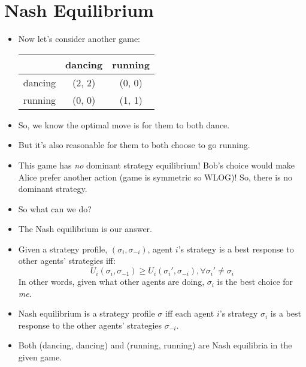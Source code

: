 \documentclass{article}
\begin{document}
\newpage
\section{Nash Equilibrium}
\begin{itemize}
    \item Now let's consider another game:
        \begin{table}[h!]
            \centering
            \begin{tabular}{|c|c|c|}
            \hline
                    & dancing & running \\ \hline
            dancing & (2, 2)  & (0, 0)  \\ \hline
            running & (0, 0)  & (1, 1)  \\ \hline
            \end{tabular}
        \end{table}
    \item So, we know the optimal move is for them to both dance.
    \item But it's also reasonable for them to both choose to go running.
    \item This game has \emph{no} dominant strategy equilibrium!  Bob's choice would make Alice prefer another action (game is symmetric so WLOG)!  So, there is no dominant strategy.
    \item So what can we do?
    \item The Nash equilibrium is our answer.
    \item Given a strategy profile, $(\sigma_i, \sigma_{-i})$, agent $i$'s strategy is a best response to other agents' strategies iff:
        \[
            U_i(\sigma_i, \sigma_{-1}) \geq U_i(\sigma_i', \sigma_{-i}), \forall \sigma_i' \neq \sigma_i
        \]
        In other words, given what other agents are doing, $\sigma_i$ is the best choice for \emph{me}.
    \item Nash equilibrium is a strategy profile $\sigma$ iff each agent $i$'s strategy $\sigma_i$ is a best response to the other agents' strategies $\sigma_{-i}$.
    \item Both (dancing, dancing) and (running, running) are Nash equilibria in the given game.
\end{itemize}
\end{document}
